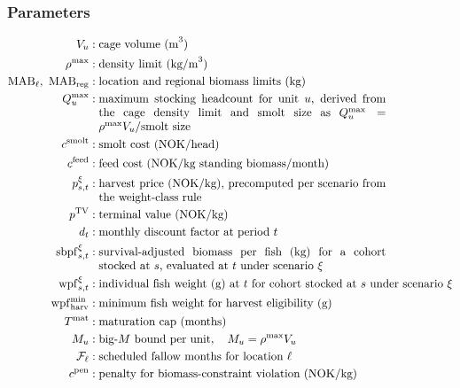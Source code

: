 \documentclass[12pt,a4paper]{article}
\begin{document}
\subsubsection{Parameters}
\begin{align*}
  V_u                                    &: \text{cage volume (m}^3) \\
  \rho^{\max}                            &: \text{density limit (kg/m}^3) \\
  \mathrm{MAB}_\ell,\ \mathrm{MAB}_{\mathrm{reg}} &: \text{location and regional biomass limits (kg)} \\
  Q^{\max}_{u}                           &: \parbox[t]{0.72\linewidth}{maximum stocking headcount for unit $u$, derived from the cage density limit and smolt size as $Q^{\max}_u = \rho^{\max} V_u / \text{smolt size}$} \\
  c^{\mathrm{smolt}}                     &: \text{smolt cost (NOK/head)} \\
  c^{\mathrm{feed}}                      &: \text{feed cost (NOK/kg standing biomass/month)} \\
  p^\xi_{s,t}                            &: \parbox[t]{0.72\linewidth}{harvest price (NOK/kg), precomputed per scenario from the weight-class rule} \\
  p^{\mathrm{TV}}                        &: \text{terminal value (NOK/kg)} \\
  d_t                                    &: \text{monthly discount factor at period } t \\
  \mathrm{sbpf}^\xi_{s,t}                &: \parbox[t]{0.72\linewidth}{survival-adjusted biomass per fish (kg) for a cohort stocked at $s$, evaluated at $t$ under scenario $\xi$} \\
  \mathrm{wpf}^\xi_{s,t}                 &: \text{individual fish weight (g) at $t$ for cohort stocked at $s$ under scenario } \xi \\
  \mathrm{wpf}^{\min}_{\mathrm{harv}}    &: \text{minimum fish weight for harvest eligibility (g)} \\
  T^{\mathrm{mat}}                       &: \text{maturation cap (months)} \\
  M_u                                    &: \text{big-}M \text{ bound per unit},\quad M_u = \rho^{\max} V_u \\
  \mathcal{F}_\ell                       &: \text{scheduled fallow months for location } \ell \\
  c^{\mathrm{pen}}                       &: \text{penalty for biomass-constraint violation (NOK/kg)}
\end{align*}
 
\end{document}

